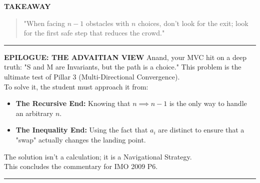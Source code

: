 \documentclass{article}
\begin{document}
\noindent \textbf{TAKEAWAY}
\begin{quote}
    "When facing $n-1$ obstacles with $n$ choices, don't look for the exit; look for the first safe step that reduces the crowd."
\end{quote}

\noindent \rule{\textwidth}{0.4pt}

\noindent \textbf{EPILOGUE: THE ADVAITIAN VIEW}
Anand, your MVC hit on a deep truth: "S and M are Invariants, but the path is a choice." This problem is the ultimate test of Pillar 3 (Multi-Directional Convergence). \\
To solve it, the student must approach it from:
\begin{itemize}
    \item \textbf{The Recursive End:} Knowing that $n \implies n-1$ is the only way to handle an arbitrary $n$.
    \item \textbf{The Inequality End:} Using the fact that $a_i$ are distinct to ensure that a "swap" actually changes the landing point.
\end{itemize}
The solution isn't a calculation; it is a Navigational Strategy. \\
This concludes the commentary for IMO 2009 P6.

\noindent \rule{\textwidth}{0.4pt}
\end{document}
